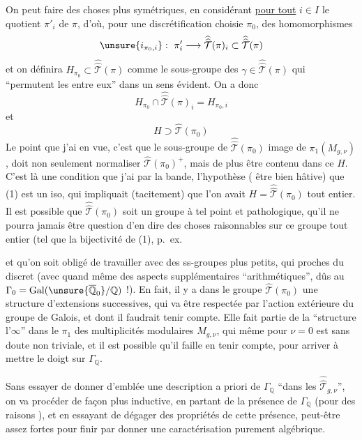 On peut faire des choses plus symétriques, en considérant \uline{pour tout} $i\in I$ le quotient  $\pi'_i$ de $\pi$, d'où, pour une discrétification choisie $\pi_0$, des homomorphismes
\[
\unsure{i_{\pi_0,i}}:\ \pi'_i\longrightarrow
\widehat{\widehat{\mathcal T}}(\pi)_i\subset
\widehat{\widehat{\mathcal T}}(\pi)
\]
et on définira $H_{\pi_0}\subset\widehat{\widehat{\mathcal T}}(\pi)$ comme le sous-groupe des $\gamma\in\widehat{\widehat{\mathcal T}}(\pi)$ qui ``permutent les  entre eux'' dans un sens évident. On a donc
\[
\tag{7}
H_{\pi_0}\cap\widehat{\widehat{\mathcal T}}(\pi)_i=H_{\pi_0,i}
\]
et
\[
\tag{8}
H\supset\widehat{\mathcal T}(\pi_0)
\]
Le point que j'ai en vue, c'est que le sous-groupe de $\widehat{\widehat{\mathcal T}}(\pi_0)$ image de $\pi_1(M_{g,\nu})$, doit non seulement normaliser $\widehat{\mathcal T}(\pi_0)^+$, mais de plus être contenu dans ce $H$. C'est là une condition que j'ai  par la bande,  l'hypothèse ( être bien hâtive) que (1) est un iso, qui impliquait (tacitement) que l'on avait $H=\widehat{\widehat{\mathcal T}}(\pi_0)$ tout entier. Il est possible que $\widehat{\widehat{\mathcal T}}(\pi_0)$ soit un groupe à tel point  et pathologique, qu'il ne pourra jamais être question d'en dire des choses raisonnables  sur  ce groupe tout entier (tel que la bijectivité de (1), p.\ ex.


et qu'on soit obligé de travailler avec des ss-groupes plus petits, qui  proches du discret (avec quand même des aspects supplémentaires ``arithmétiques'', dûs au $\Gamma_0=\mathrm{Gal}(\unsure{\overline{\mathbb Q}_0}/\mathbb Q)$ !). En fait, il y a  dans le groupe $\widehat{\mathcal T}(\pi_0)$ une structure  d'extensions successives, qui va être respectée par l'action extérieure du groupe de Galois, et dont il faudrait tenir compte. Elle fait partie de la ``structure  l'$\infty$'' dans le $\pi_1$ des  multiplicités modulaires $M_{g,\nu}$, qui même pour $\nu=0$ est sans doute non triviale, et il est possible qu'il faille en tenir compte, pour arriver à mettre le doigt sur $\Gamma_{\mathbb Q}$.

Sans essayer de donner d'emblée une description a priori de $\Gamma_{\mathbb Q}$ ``dans les $\widehat{\widehat{\mathcal T}}_{g,\nu}$'', on va procéder de façon plus inductive, en partant de la présence de $\Gamma_{\mathbb Q}$ (pour des raisons ), et en essayant de dégager des propriétés de cette présence, peut-être assez fortes pour finir par donner une caractérisation purement algébrique.

